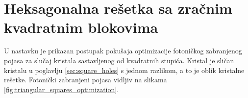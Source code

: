 \documentclass[utf8, seminar, numeric]{fer}
\begin{document}
\section{Heksagonalna rešetka sa zračnim kvadratnim blokovima}

U nastavku je prikazan postupak pokušaja optimizacije fotoničkog zabranjenog
pojasa za slučaj kristala sastavljenog od kvadratnih stupića. Kristal je
sličan kristalu u poglavlju \ref{sec:square_holes} s jednom razlikom, a to je
oblik kristalne rešetke. Fotonički zabranjeni pojasa vidljiv na slikama
\ref{fig:triangular_squares_optimization}.

\begin{figure}[ht]
\centering
    \qquad

\end{figure}
\end{document}
